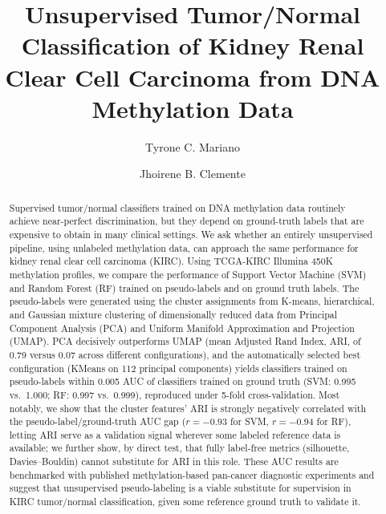 \documentclass[sigconf]{acmart}
\begin{document}
\title{Unsupervised Tumor/Normal Classification of Kidney Renal Clear Cell Carcinoma from DNA Methylation Data}

\author{Tyrone C. Mariano}

\author{Jhoirene B. Clemente}

\renewcommand{\shortauthors}{Mariano and Clemente}

\begin{abstract}
Supervised tumor/normal classifiers trained on DNA methylation data routinely achieve near-perfect discrimination, but they depend on ground-truth labels that are expensive to obtain in many clinical settings. We ask whether an entirely unsupervised pipeline, using unlabeled methylation data, can approach the same performance for kidney renal clear cell carcinoma (KIRC). Using TCGA-KIRC Illumina 450K methylation profiles, we compare the performance of Support Vector Machine (SVM) and Random Forest (RF) trained on pseudo-labels and on ground truth labels. The pseudo-labels were generated using the cluster assignments from K-means, hierarchical, and Gaussian mixture clustering of dimensionally reduced data from Principal Component Analysis (PCA) and Uniform Manifold Approximation and Projection (UMAP). PCA decisively outperforms UMAP (mean Adjusted Rand Index, ARI, of 0.79 versus 0.07 across different configurations), and the automatically selected best configuration (KMeans on 112 principal components) yields classifiers trained on pseudo-labels within 0.005 AUC of classifiers trained on ground truth (SVM: 0.995 vs.\ 1.000; RF: 0.997 vs.\ 0.999), reproduced under 5-fold cross-validation. Most notably, we show that the cluster features' ARI is strongly negatively correlated with the pseudo-label/ground-truth AUC gap ($r=-0.93$ for SVM, $r=-0.94$ for RF), letting ARI serve as a validation signal wherever some labeled reference data is available; we further show, by direct test, that fully label-free metrics (silhouette, Davies--Bouldin) cannot substitute for ARI in this role. These AUC results are benchmarked with published methylation-based pan-cancer diagnostic experiments and suggest that unsupervised pseudo-labeling is a viable substitute for supervision in KIRC tumor/normal classification, given some reference ground truth to validate it.
\end{abstract}
\end{document}
